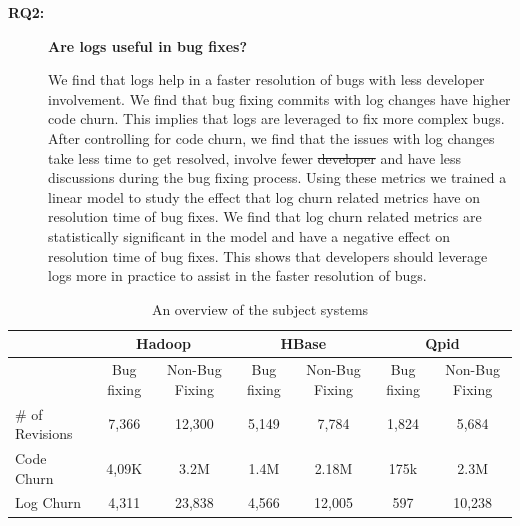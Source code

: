 \documentclass[conference]{IEEEtran}
\providecommand{\DIFadd}[1]{{\protect\color{blue}\uwave{#1}}} %
\providecommand{\DIFdel}[1]{{\protect\color{red}\sout{#1}}}                      %
\providecommand{\DIFaddbegin}{} %
\providecommand{\DIFaddend}{} %
\providecommand{\DIFdelbegin}{} %
\providecommand{\DIFdelend}{} %
\begin{document}
\begin{description}
\item[\textbf{RQ2:}]\textbf{	Are logs useful in bug fixes?}

We find that logs help in a faster resolution of bugs with less developer
involvement. We find that bug fixing commits with log changes have
higher code churn. This implies that logs are leveraged to fix more complex bugs. After controlling for code churn, we find that the issues with log changes take less time to get resolved, involve fewer \DIFdelbegin \DIFdel{developer }\DIFdelend \DIFaddbegin \DIFadd{developers }\DIFaddend and have less discussions during the bug fixing process. Using these metrics we trained a linear model to study the effect that log churn related metrics have on resolution time of bug fixes.
 We find that log churn related metrics are statistically significant in the model and have a negative effect on resolution time of bug fixes. This shows that developers should leverage logs more in practice to assist in the faster resolution of bugs.


\end{description}




\begin{table}
		\protect\caption{An overview of the subject systems}
		\label{tba:Overview}
	\centering{}%
	\begin{tabular}{|>{\centering}p{3cm}|c|c|c|c|c|c|}
		\hline 
		\multirow{2}{*}{Projects} & \multicolumn{2}{c|}{Hadoop} & \multicolumn{2}{c|}{HBase} & \multicolumn{2}{c|}{Qpid}\tabularnewline
		\cline{2-7} 
		& Bug fixing  & Non-Bug Fixing & Bug fixing  & Non-Bug Fixing & Bug fixing  & Non-Bug Fixing \tabularnewline
		\hline 
		\# of Revisions & 7,366 & 12,300 & 5,149 & 7,784 & 1,824 & 5,684\tabularnewline
		\hline 
		Code Churn & 4,09K & 3.2M & 1.4M & 2.18M & 175k & 2.3M\tabularnewline
		\hline 
		Log Churn & 4,311 & 23,838 & 4,566 & 12,005 & 597 & 10,238\tabularnewline
		\hline 
	\end{tabular}
\end{table}
\end{document}
